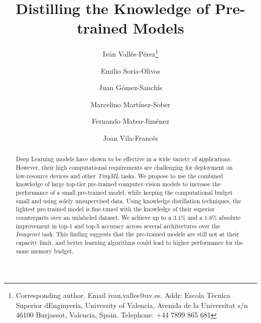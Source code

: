 \documentclass{elsarticle}
\begin{document}
	\begin{frontmatter}
		\title{Distilling the Knowledge of Pre-trained Models}
		\author[UV]{Iván Vallés-Pérez\footnote{Corresponding author. Email ivan.valles@uv.es. Addr: Escola Tècnica Superior d\textsc{}Enginyeria, University of Valencia, Avenida de la Universitat s/n 46100 Burjassot, Valencia, Spain. Telephone: +44 7899 865 681}}
		\author[UV]{Emilio Soria-Olivas}
		\author[UV]{Juan Gómez-Sanchís}
		\author[UV]{Marcelino Martínez-Sober}%
		\author[UV]{Fernando Mateo-Jiménez}
		\author[UV]{Joan Vila-Francés}
		\address[UV]{IDAL, Intelligent Data Analysis Laboratory. Escola Tècnica Superior d'Enginyeria, University of Valencia, Avenida de la Universitat s/n 46100 Burjassot, Valencia, Spain. %
		}

		\begin{abstract}
		Deep Learning models have shown to be effective in a wide variety of  applications. However, their high computational requirements are challenging for deployment on low-resource devices and other \textit{TinyML} tasks. We propose to use the combined knowledge of large top-tier pre-trained computer-vision models to increase the performance of a small pre-trained model, while keeping the computational budget small and using solely unsupervised data. Using knowledge distillation techniques, the lightest pre-trained model is fine-tuned with the knowledge of their superior counterparts over an unlabeled dataset. We achieve up to a 3.1\% and a 1.8\% absolute improvement in top-1 and top-5 accuracy across several architectures over the \textit{Imagenet} task. This finding suggests that the pre-trained models are still not at their capacity limit, and better learning algorithms could lead to higher performance for the same memory budget.%
		\end{abstract}


\end{frontmatter}
\end{document}
